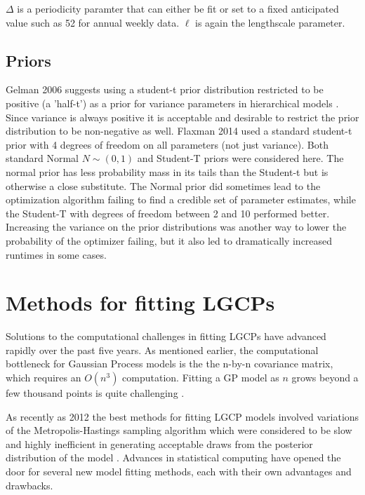 $\Delta$ is a periodicity paramter that can either be fit or set to a fixed anticipated value such as 52 for annual weekly data. $\ell$ is again the lengthscale parameter.\par


\subsection{Priors}

Gelman 2006 suggests using a student-t prior distribution restricted to be positive (a 'half-t') as a prior for variance parameters in hierarchical models \cite{gelman_2006}. Since variance is always positive it is acceptable and desirable to restrict the prior distribution to be non-negative as well. Flaxman 2014 used a standard student-t prior with 4 degrees of freedom on all parameters (not just variance). Both standard Normal $N \sim (0,1)$ and Student-T priors were considered here. The normal prior has less probability mass in its tails than the Student-t but is otherwise a close substitute. The Normal prior did sometimes lead to the optimization algorithm failing to find a credible set of parameter estimates, while the Student-T with degrees of freedom between 2 and 10 performed better. Increasing the variance on the prior distributions was another way to lower the probability of the optimizer failing, but it also led to dramatically increased runtimes in some cases.

\section{Methods for fitting LGCPs}

Solutions to the computational challenges in fitting LGCPs have advanced rapidly over the past five years. As mentioned earlier, the computational bottleneck for Gaussian Process models is the the n-by-n covariance matrix, which requires an $O(n^3)$ computation. Fitting a GP model as $n$ grows beyond a few thousand points is quite challenging \cite{gelman2013bayesian}. \par

 As recently as 2012 the best methods for fitting LGCP models involved variations of the Metropolis-Hastings sampling algorithm which were considered to be slow and highly inefficient in generating acceptable draws from the posterior distribution of the model \cite{murray_2012}. Advances in statistical computing have opened the door for several new model fitting methods, each with their own advantages and drawbacks.


